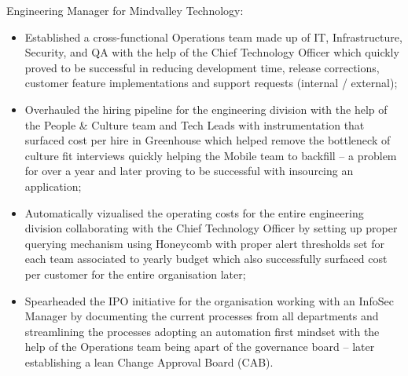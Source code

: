 \documentclass[11pt,a4paper,nolmodern,colorlinks=true,linkcolor=true]{moderncv}
\begin{document}
%
  {Engineering Manager for Mindvalley Technology:
    \begin{itemize}
      \item Established a cross-functional Operations team made up of IT, Infrastructure, Security, and QA with the help of the Chief Technology Officer which quickly proved to be successful in reducing development time, release corrections, customer feature implementations and support requests (internal / external);
      \item Overhauled the hiring pipeline for the engineering division with the help of the People \& Culture team and Tech Leads with instrumentation that surfaced cost per hire in Greenhouse which helped remove the bottleneck of culture fit interviews quickly helping the Mobile team to backfill -- a problem for over a year and later proving to be successful with insourcing an application;
      \item Automatically vizualised the operating costs for the entire engineering division collaborating with the Chief Technology Officer by setting up proper querying mechanism using Honeycomb with proper alert thresholds set for each team associated to yearly budget which also successfully surfaced cost per customer for the entire organisation later;
      \item Spearheaded the IPO initiative for the organisation working with an InfoSec Manager by documenting the current processes from all departments and streamlining the processes adopting an automation first mindset with the help of the Operations team being apart of the governance board -- later establishing a lean Change Approval Board (CAB).
    \end{itemize}
}
\end{document}

